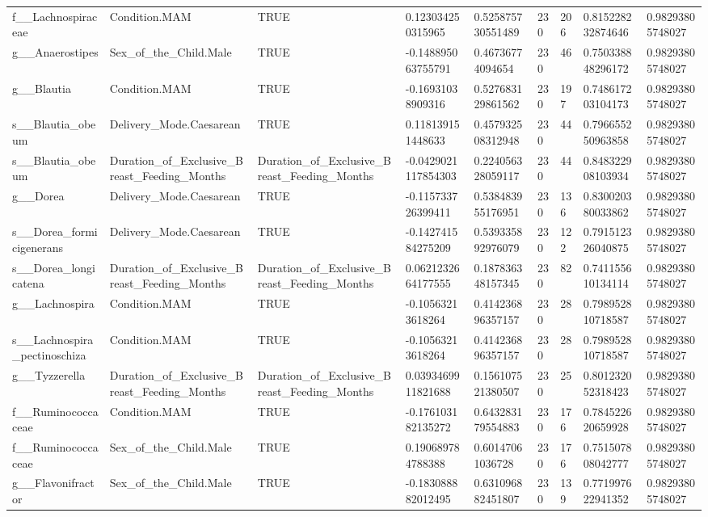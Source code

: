 \begin{longtable}{lllllllll}
f\_\_Lachnospiraceae & Condition.MAM & TRUE & 0.123034250315965 & 0.525875730551489 & 230 & 206 & 0.815228232874646 & 0.98293805748027 \\
g\_\_Anaerostipes & Sex\_of\_the\_Child.Male & TRUE & -0.148895063755791 & 0.46736774094654 & 230 & 46 & 0.750338848296172 & 0.98293805748027 \\
g\_\_Blautia & Condition.MAM & TRUE & -0.16931038909316 & 0.527683129861562 & 230 & 197 & 0.748617203104173 & 0.98293805748027 \\
s\_\_Blautia\_obeum & Delivery\_Mode.Caesarean & TRUE & 0.118139151448633 & 0.457932508312948 & 230 & 44 & 0.796655250963858 & 0.98293805748027 \\
s\_\_Blautia\_obeum & Duration\_of\_Exclusive\_Breast\_Feeding\_Months & Duration\_of\_Exclusive\_Breast\_Feeding\_Months & -0.0429021117854303 & 0.224056328059117 & 230 & 44 & 0.848322908103934 & 0.98293805748027 \\
g\_\_Dorea & Delivery\_Mode.Caesarean & TRUE & -0.115733726399411 & 0.538483955176951 & 230 & 136 & 0.830020380033862 & 0.98293805748027 \\
s\_\_Dorea\_formicigenerans & Delivery\_Mode.Caesarean & TRUE & -0.142741584275209 & 0.539335892976079 & 230 & 122 & 0.791512326040875 & 0.98293805748027 \\
s\_\_Dorea\_longicatena & Duration\_of\_Exclusive\_Breast\_Feeding\_Months & Duration\_of\_Exclusive\_Breast\_Feeding\_Months & 0.0621232664177555 & 0.187836348157345 & 230 & 82 & 0.741155610134114 & 0.98293805748027 \\
g\_\_Lachnospira & Condition.MAM & TRUE & -0.10563213618264 & 0.414236896357157 & 230 & 28 & 0.798952810718587 & 0.98293805748027 \\
s\_\_Lachnospira\_pectinoschiza & Condition.MAM & TRUE & -0.10563213618264 & 0.414236896357157 & 230 & 28 & 0.798952810718587 & 0.98293805748027 \\
g\_\_Tyzzerella & Duration\_of\_Exclusive\_Breast\_Feeding\_Months & Duration\_of\_Exclusive\_Breast\_Feeding\_Months & 0.0393469911821688 & 0.156107521380507 & 230 & 25 & 0.801232052318423 & 0.98293805748027 \\
f\_\_Ruminococcaceae & Condition.MAM & TRUE & -0.176103182135272 & 0.643283179554883 & 230 & 176 & 0.784522620659928 & 0.98293805748027 \\
f\_\_Ruminococcaceae & Sex\_of\_the\_Child.Male & TRUE & 0.190689784788388 & 0.60147061036728 & 230 & 176 & 0.751507808042777 & 0.98293805748027 \\
g\_\_Flavonifractor & Sex\_of\_the\_Child.Male & TRUE & -0.183088882012495 & 0.631096882451807 & 230 & 139 & 0.771997622941352 & 0.98293805748027 \\

\end{longtable}
